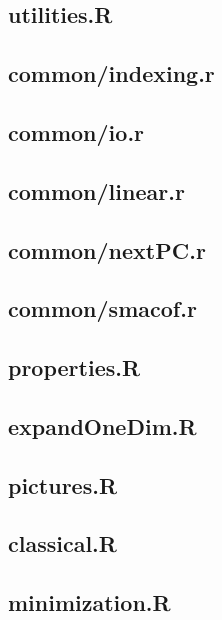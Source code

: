 \documentclass[
  12pt,
]{book}
\begin{document}
\subsection{utilities.R}\label{aputilitiescode}

\subsection{common/indexing.r}\label{apindexingcode}

\subsection{common/io.r}\label{apiocode}

\subsection{common/linear.r}\label{aplinearcode}

\subsection{common/nextPC.r}\label{appermcode}

\subsection{common/smacof.r}\label{apsmacofcode}

\subsection{properties.R}\label{apcodeprop}

\subsection{expandOneDim.R}\label{apcodeexpand}

\subsection{pictures.R}\label{apcodepic}

\subsection{classical.R}\label{apcodeclass}

\subsection{minimization.R}\label{apcodeminim}
\end{document}
